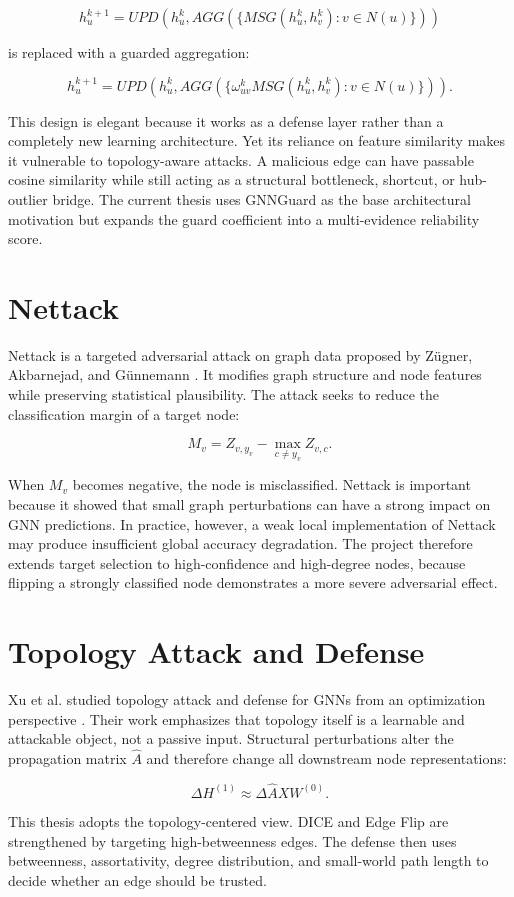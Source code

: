 \documentclass[12pt,oneside]{report}
\begin{document}
$$
h_u^{k+1}=UPD(h_u^k,AGG(\{MSG(h_u^k,h_v^k):v\in N(u)\}))
$$

is replaced with a guarded aggregation:

$$
h_u^{k+1}=UPD(h_u^k,AGG(\{\omega_{uv}^kMSG(h_u^k,h_v^k):v\in N(u)\})).
$$

This design is elegant because it works as a defense layer rather than a completely new learning architecture. Yet its reliance on feature similarity makes it vulnerable to topology-aware attacks. A malicious edge can have passable cosine similarity while still acting as a structural bottleneck, shortcut, or hub-outlier bridge. The current thesis uses GNNGuard as the base architectural motivation but expands the guard coefficient into a multi-evidence reliability score.

\section{Nettack}
Nettack is a targeted adversarial attack on graph data proposed by Z\"ugner, Akbarnejad, and G\"unnemann \cite{zugner2018nettack}. It modifies graph structure and node features while preserving statistical plausibility. The attack seeks to reduce the classification margin of a target node:

$$
M_v=Z_{v,y_v}-\max_{c\neq y_v}Z_{v,c}.
$$

When $M_v$ becomes negative, the node is misclassified. Nettack is important because it showed that small graph perturbations can have a strong impact on GNN predictions. In practice, however, a weak local implementation of Nettack may produce insufficient global accuracy degradation. The project therefore extends target selection to high-confidence and high-degree nodes, because flipping a strongly classified node demonstrates a more severe adversarial effect.

\section{Topology Attack and Defense}
Xu et al. studied topology attack and defense for GNNs from an optimization perspective \cite{xu2019topology}. Their work emphasizes that topology itself is a learnable and attackable object, not a passive input. Structural perturbations alter the propagation matrix $\hat{A}$ and therefore change all downstream node representations:

$$
\Delta H^{(1)}\approx \Delta \hat{A}XW^{(0)}.
$$

This thesis adopts the topology-centered view. DICE and Edge Flip are strengthened by targeting high-betweenness edges. The defense then uses betweenness, assortativity, degree distribution, and small-world path length to decide whether an edge should be trusted.
\end{document}
